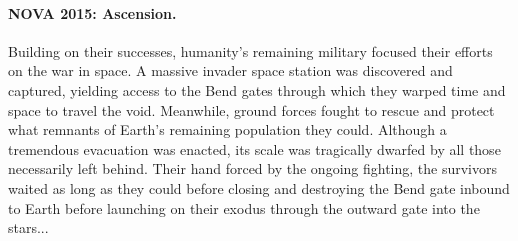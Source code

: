 \documentclass{novanarrative}
\begin{document}
\paragraph{NOVA 2015: Ascension.}  Building on their successes,
humanity's remaining military focused their efforts on the war in
space.  A massive invader space station was discovered and captured,
yielding access to the Bend gates through which they warped time and
space to travel the void.  Meanwhile, ground forces fought to rescue
and protect what remnants of Earth's remaining population they could.
Although a tremendous evacuation was enacted, its scale was tragically
dwarfed by all those necessarily left behind.  Their hand forced by
the ongoing fighting, the survivors waited as long as they could
before closing and destroying the Bend gate inbound to Earth before
launching on their exodus through the outward gate into the stars...

\clearpage
\squelchbackground

\pagebreak
\restorebackground

\end{document}
